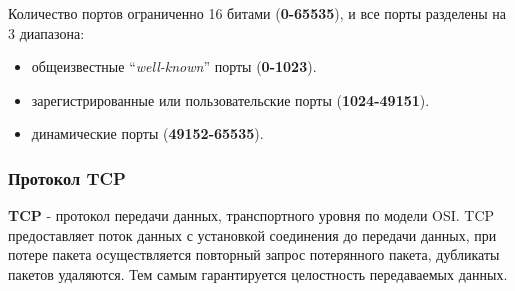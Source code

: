 Количество портов ограниченно 16 битами (\textbf{0-65535}), и все порты
разделены на 3 диапазона:

\begin{itemize}
\tightlist
\item
  общеизвестные ``\emph{well-known}'' порты (\textbf{0-1023}).
\item
  зарегистрированные или пользовательские порты (\textbf{1024-49151}).
\item
  динамические порты (\textbf{49152-65535}).
\end{itemize}

\hypertarget{ux43fux440ux43eux442ux43eux43aux43eux43b-tcp}{%
\subsubsection{Протокол
TCP}\label{ux43fux440ux43eux442ux43eux43aux43eux43b-tcp}}

\textbf{TCP} - протокол передачи данных, транспортного уровня по модели
OSI. TCP предоставляет поток данных с установкой соединения до передачи
данных, при потере пакета осуществляется повторный запрос потерянного
пакета, дубликаты пакетов удаляются. Тем самым гарантируется целостность
передаваемых данных.
